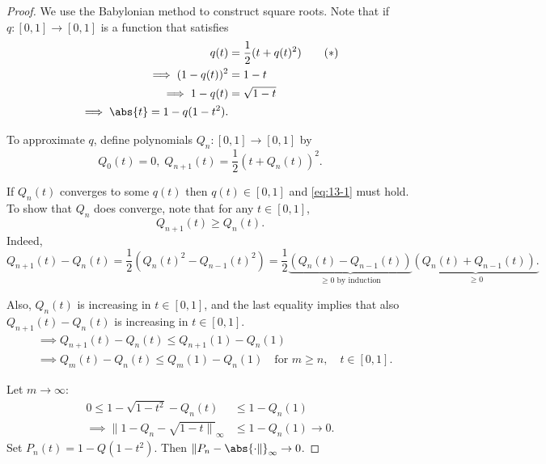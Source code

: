 \documentclass{article}
\begin{document}
\begin{proof}
    We use the Babylonian method to construct square roots.
    Note that if $q : [0, 1] \to [0, 1]$ is a function that satisfies
    \begin{align*}
        q(t) &= \frac{1}{2}(t + q(t)^2) \tag{$*$} \label{eq:13-1} \\
        \implies (1-q(t))^2 &= 1-t \\
        \implies 1 - q(t) &= \sqrt{1 - t} \\
        \implies \abs{t} = 1 - q(1-t^2).
    \end{align*}

    To approximate $q$, define polynomials $Q_n : [0, 1] \to [0, 1]$ by
    \begin{equation*}
        Q_0(t) = 0, \; Q_{n+1}(t) = \frac{1}{2}(t + Q_n(t))^2.
    \end{equation*}

    If $Q_n(t)$ converges to some $q(t)$ then $q(t) \in [0, 1]$ and \eqref{eq:13-1} must hold.
    To show that $Q_n$ does converge, note that for any $t \in [0, 1]$,
    \begin{equation*}
        Q_{n+1}(t) \geq Q_n(t).
    \end{equation*}
    Indeed,
    \begin{equation*}
        Q_{n+1}(t) - Q_n(t) = \frac{1}{2} \left(Q_n(t)^2 - Q_{n-1}(t)^2\right) = \frac{1}{2}\underbrace{(Q_n(t) - Q_{n-1}(t))}_{\geq 0 \text{ by induction}} \underbrace{(Q_n(t) + Q_{n-1}(t)).}_{\geq 0}
    \end{equation*}

    Also, $Q_n(t)$ is increasing in $t \in [0, 1]$, and the last equality implies that also $Q_{n+1}(t) - Q_n(t)$ is increasing in $t \in [0, 1]$.
    \begin{align*}
        &\implies Q_{n+1}(t) - Q_n(t) \leq Q_{n+1}(1) - Q_n(1) \\
        &\implies Q_m(t) - Q_n(t) \leq Q_m(1) - Q_n(1) \quad \text{for } m \geq n, \quad t \in [0, 1].
    \end{align*}

    Let $m \to \infty$:
    \begin{align*}
        0 \leq 1 - \sqrt{1 - t^2} - Q_n(t) &\leq 1 - Q_n(1) \\
        \implies \|1 - Q_n - \sqrt{1-t\|}_\infty &\leq 1 - Q_n(1) \to 0.
    \end{align*}
    Set $P_n(t) = 1 - Q(1-t^2)$. Then $\|P_n - \abs{\cdot\|}_\infty \to 0$.
\end{proof}
\end{document}
